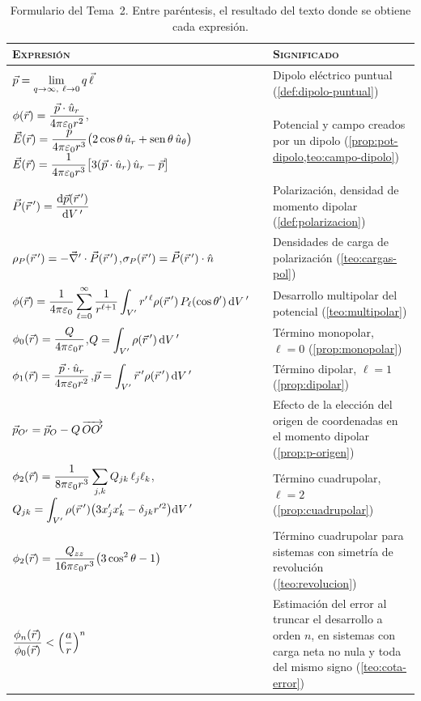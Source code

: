 \begin{table}[ht]
\centering
\caption{Formulario del Tema~2. Entre paréntesis, el resultado del texto donde se obtiene cada expresión.}
\label{tab:formulario}
\renewcommand{\arraystretch}{2.05}
\small
\begin{tabular}{@{}>{\centering\arraybackslash}p{}>{\raggedright\arraybackslash}p{}@{}}
  \toprule
  \textsc{Expresión} & \textsc{Significado}\\
  \midrule
  $\displaystyle\vp=\lim_{q\to\infty,\ \ell\to0}q\,\vl$ & Dipolo eléctrico puntual (\cref{def:dipolo-puntual})\\
  $\displaystyle\phi(\vec{r})=\frac{\vec{p}\cdot\hat{u}_{r}}{4\pi\varepsilon_{0} r^{2}}$,\quad $\displaystyle\vec{E}(\vec{r})=\frac{p}{4\pi\varepsilon_{0} r^{3}}\bigl(2\cos\theta\,\hat{u}_{r}+\operatorname{sen}\theta\,\hat{u}_{\theta}\bigr)$\newline
  $\displaystyle\vec{E}(\vec{r})=\frac{1}{4\pi\varepsilon_{0} r^{3}}\bigl[3(\vec{p}\cdot\hat{u}_{r})\,\hat{u}_{r}-\vec{p}\bigr]$
     & Potencial y campo creados por un dipolo (\cref{prop:pot-dipolo,teo:campo-dipolo})\\
  $\displaystyle\vec{P}(\vec{r}\,')=\frac{\mathrm{d}\vec{p}(\vec{r}\,')}{\mathrm{d} V\,'}$ & Polarización, densidad de momento dipolar (\cref{def:polarizacion})\\
  $\rho_{P}(\vec{r}\,')=-\vec{\nabla}'\cdot\vec{P}(\vec{r}\,')$,\quad $\sigma_{P}(\vec{r}\,')=\vec{P}(\vec{r}\,')\cdot\hat{n}$ & Densidades de carga de polarización (\cref{teo:cargas-pol})\\
  $\displaystyle\phi(\vec{r})=\frac{1}{4\pi\varepsilon_{0}}\sum_{\ell=0}^{\infty}\frac{1}{r^{\ell+1}}\int_{V'}r'^{\,\ell}\rho(\vec{r}\,')\,P_{\ell}(\cos\theta')\,\mathrm{d} V\,'$ & Desarrollo multipolar del potencial (\cref{teo:multipolar})\\
  $\displaystyle\phi_{0}(\vec{r})=\frac{Q}{4\pi\varepsilon_{0} r}$,\quad $\displaystyle Q=\int_{V'}\rho(\vec{r}\,')\,\mathrm{d} V\,'$ & Término monopolar, $\ell=0$ (\cref{prop:monopolar})\\
  $\displaystyle\phi_{1}(\vec{r})=\frac{\vec{p}\cdot\hat{u}_{r}}{4\pi\varepsilon_{0} r^{2}}$,\quad $\displaystyle\vec{p}=\int_{V'}\vec{r}\,'\rho(\vec{r}\,')\,\mathrm{d} V\,'$ & Término dipolar, $\ell=1$ (\cref{prop:dipolar})\\
  $\vec{p}_{O'}=\vec{p}_{O}-Q\,\overrightarrow{OO'}$ & Efecto de la elección del origen de coordenadas en el momento dipolar (\cref{prop:p-origen})\\
  $\displaystyle\phi_{2}(\vec{r})=\frac{1}{8\pi\varepsilon_{0} r^{3}}\sum_{j,k}Q_{jk}\,\ell_{j}\ell_{k}$,\quad $\displaystyle Q_{jk}=\int_{V'}\rho(\vec{r}\,')\bigl(3x'_jx'_k-\delta_{jk}r'^{2}\bigr)\mathrm{d} V\,'$
     & Término cuadrupolar, $\ell=2$ (\cref{prop:cuadrupolar})\\
  $\displaystyle\phi_{2}(\vec{r})=\frac{Q_{zz}}{16\pi\varepsilon_{0} r^{3}}\bigl(3\cos^{2}\theta-1\bigr)$ & Término cuadrupolar para sistemas con simetría de revolución (\cref{teo:revolucion})\\
  $\displaystyle\frac{\phi_{n}(\vec{r})}{\phi_{0}(\vec{r})}<\Bigl(\frac{a}{r}\Bigr)^{n}$ & Estimación del error al truncar el desarrollo a orden $n$, en sistemas con carga neta no nula y toda del mismo signo (\cref{teo:cota-error})\\
  \bottomrule
\end{tabular}
\end{table}

